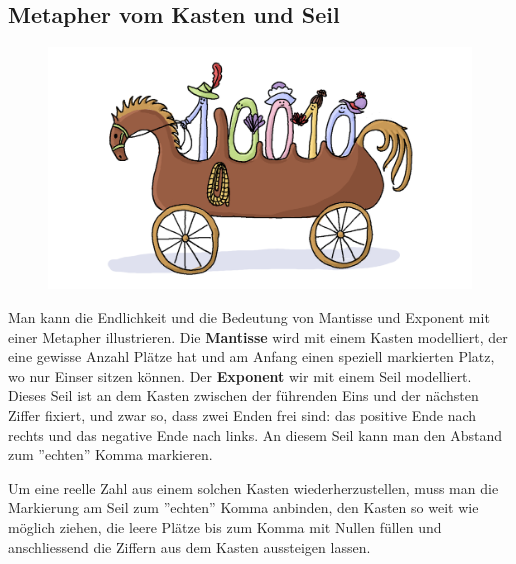 \documentclass{article}
\begin{document}
\subsection*{Metapher vom Kasten und Seil}

\begin{figure}[H]
\centering
\includegraphics[width=\textwidth]{Pictures/Kutsche.png} 
\end{figure}

Man kann die Endlichkeit und die Bedeutung von Mantisse und Exponent mit einer Metapher illustrieren. Die \textbf{Mantisse} wird mit einem Kasten modelliert, der eine gewisse Anzahl Plätze hat und am Anfang einen speziell markierten Platz, wo nur Einser sitzen können. Der \textbf{Exponent} wir mit einem Seil modelliert. Dieses Seil ist an dem Kasten zwischen der führenden Eins und der nächsten Ziffer fixiert, und zwar so, dass zwei Enden frei sind: das positive Ende nach rechts und das negative Ende nach links. An diesem Seil kann man den Abstand zum ''echten'' Komma markieren. 

Um eine reelle Zahl aus einem solchen Kasten wiederherzustellen, muss man die Markierung am Seil zum ''echten'' Komma anbinden, den Kasten so weit wie möglich ziehen, die leere Plätze bis zum Komma mit Nullen füllen und anschliessend die Ziffern aus dem Kasten aussteigen lassen.
\end{document}

